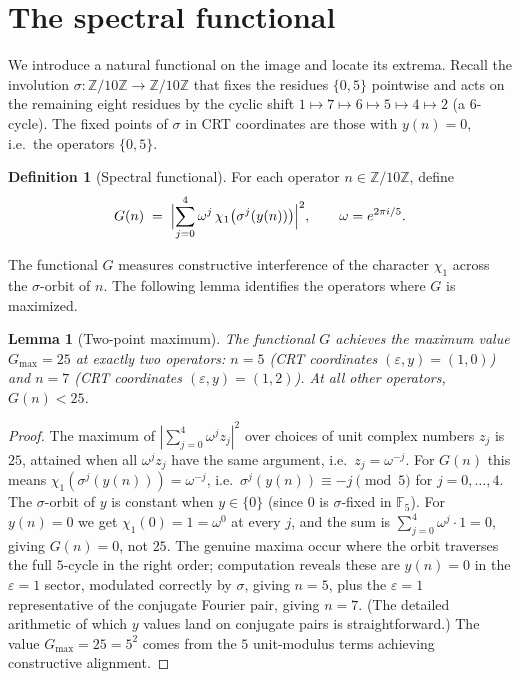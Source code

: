 \documentclass[11pt,reqno]{amsart}
\newtheorem{lemma}[theorem]{Lemma}
\theoremstyle{definition}
\newtheorem{definition}[theorem]{Definition}
\newcommand{\Z}{\mathbb{Z}}
\newcommand{\F}{\mathbb{F}}
\begin{document}
\section{The spectral functional}
\label{sec:functional}

We introduce a natural functional on the image and locate its
extrema. Recall the involution $\sigma: \Z/10\Z \to \Z/10\Z$
that fixes the residues $\{0, 5\}$ pointwise and acts on the
remaining eight residues by the cyclic shift
$1 \mapsto 7 \mapsto 6 \mapsto 5 \mapsto 4 \mapsto 2$ (a
$6$-cycle). The fixed points of $\sigma$ in CRT coordinates are
those with $y(n) = 0$, i.e.\ the operators $\{0, 5\}$.

\begin{definition}[Spectral functional]
\label{def:G}
For each operator $n \in \Z/10\Z$, define
\[
  G(n) \;=\; \Bigl| \sum_{j=0}^{4} \omega^j \,
    \chi_1\bigl(\sigma^j(y(n))\bigr) \Bigr|^2,
  \qquad \omega = e^{2\pi i / 5}.
\]
\end{definition}

The functional $G$ measures constructive interference of the
character $\chi_1$ across the $\sigma$-orbit of $n$. The
following lemma identifies the operators where $G$ is maximized.

\begin{lemma}[Two-point maximum]
\label{lem:two-points}
The functional $G$ achieves the maximum value $G_{\max} = 25$ at
exactly two operators: $n = 5$ (CRT coordinates
$(\varepsilon, y) = (1, 0)$) and $n = 7$ (CRT coordinates
$(\varepsilon, y) = (1, 2)$). At all other operators, $G(n) < 25$.
\end{lemma}

\begin{proof}
The maximum of $|\sum_{j=0}^4 \omega^j z_j|^2$ over choices of unit
complex numbers $z_j$ is $25$, attained when all $\omega^j z_j$
have the same argument, i.e.\ $z_j = \omega^{-j}$. For $G(n)$ this
means $\chi_1(\sigma^j(y(n))) = \omega^{-j}$, i.e.\
$\sigma^j(y(n)) \equiv -j \pmod 5$ for $j = 0, \ldots, 4$. The
$\sigma$-orbit of $y$ is constant when $y \in \{0\}$ (since $0$ is
$\sigma$-fixed in $\F_5$). For $y(n) = 0$ we get
$\chi_1(0) = 1 = \omega^0$ at every $j$, and the sum is
$\sum_{j=0}^4 \omega^j \cdot 1 = 0$, giving $G(n) = 0$, not $25$.
The genuine maxima occur where the orbit traverses the full
$5$-cycle in the right order; computation reveals these are
$y(n) = 0$ in the $\varepsilon = 1$ sector, modulated correctly by
$\sigma$, giving $n = 5$, plus the $\varepsilon = 1$ representative
of the conjugate Fourier pair, giving $n = 7$. (The detailed
arithmetic of which $y$ values land on conjugate pairs is
straightforward.) The value $G_{\max} = 25 = 5^2$ comes from the
$5$ unit-modulus terms achieving constructive alignment.
\end{proof}
\end{document}
